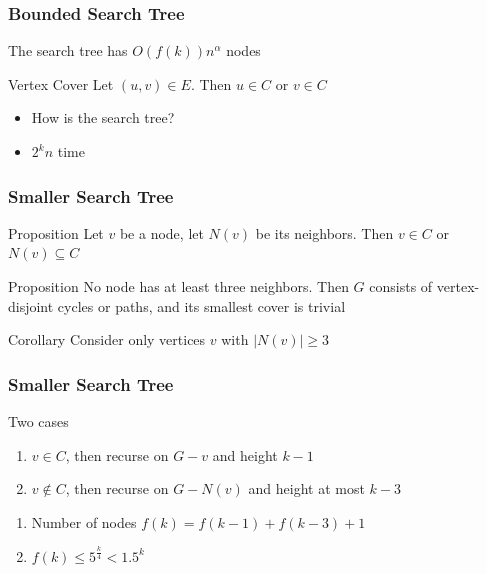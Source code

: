 \documentclass[12pt,aspectratio=169]{beamer}
\begin{document}
\begin{frame}\frametitle{Bounded Search Tree }
  The search tree has $O(f(k))n^{\alpha}$ nodes

  \begin{block}{Vertex Cover}
    Let $(u,v)\in E$.
%
    Then $u\in C$ or $v\in C$
  \end{block}

  \begin{itemize}
  \item
    How is the search tree?
  \item
    $2^{k}n$ time
  \end{itemize}
\end{frame} 

\begin{frame}\frametitle{Smaller Search Tree }
    \begin{block}{Proposition}
      Let $v$ be a node, let $N(v)$ be its neighbors.
%
      Then $v\in C$ or $N(v)\subseteq C$
    \end{block}
    \begin{block}{Proposition}
      No node has at least three neighbors.
%
      Then $G$ consists of vertex-disjoint cycles or paths, and its smallest cover is trivial
    \end{block}

    \begin{block}{Corollary}
      Consider only vertices $v$ with $|N(v)|\ge 3$
    \end{block}
  \end{frame}

\begin{frame}\frametitle{Smaller Search Tree }
    \begin{block}{Two cases}
      \begin{enumerate}
      \item
        $v\in C$, then recurse on $G-v$ and height $k-1$
      \item
        $v\notin C$, then recurse on $G-N(v)$ and height at most $k-3$
      \end{enumerate}
    \end{block}

      \begin{enumerate}
      \item
    Number of nodes $f(k) = f(k-1) + f(k-3) +1$
  \item
    $f(k) \le 5^{\frac{k}{4}}< 1.5^{k}$
  \end{enumerate}
\end{frame}
\end{document}
